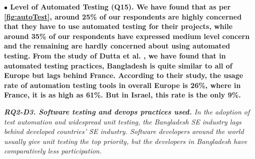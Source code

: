 
\nd\bf{$\bullet$ Level of Automated Testing (Q15).} We have found that as per
\ref{fig:autoTest}, around 25\% of our respondents are highly concerned that
they have to use automated testing for their projects, while around 35\% of our
respondents have expressed medium level concern and the remaining are hardly
concerned about using automated testing. From the study of Dutta et al.
\citep{dutta1999}, we have found that in automated testing practices, Bangladesh
is quite similar to all of Europe but lags behind France. According to their
study, the usage rate of automation testing tools in overall Europe is 26\%,
where in France, it is as high as 61\%. But in Israel, this rate is the only
9\%.

\begin{tcolorbox}[flushleft upper,boxrule=1pt,arc=0pt,left=0pt,right=0pt,top=0pt,bottom=0pt,colback=white,after=\ignorespacesafterend\par\noindent]
\nd\it{\bf{RQ2-D3. Software testing and devops practices used.}} 
In the adoption of test automation and widespread unit testing, the Bangladesh SE industry lags behind developed countries'  SE industry. 
Software developers around the world usually give unit testing the top priority, but the developers in Bangladesh have comparatively less participation. %
\end{tcolorbox}
